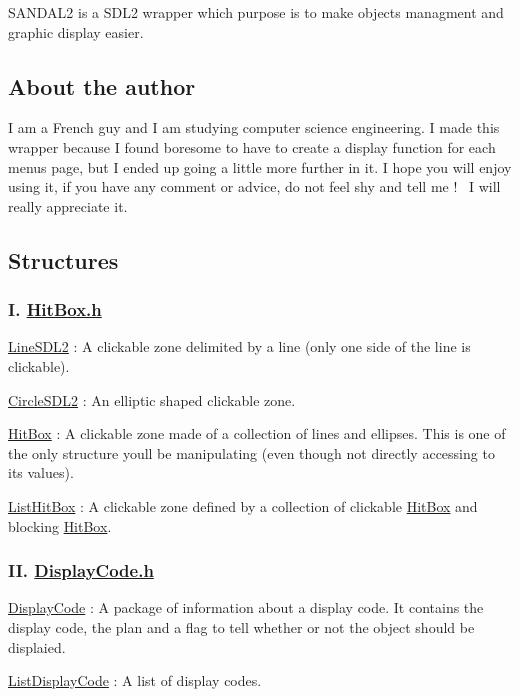 S\+A\+N\+D\+A\+L2 is a S\+D\+L2 wrapper which purpose is to make objects managment and graphic display easier.

\subsection*{About the author}

I am a French guy and I am studying computer science engineering. I made this wrapper because I found boresome to have to create a display function for each menu\textquotesingle{}s page, but I ended up going a little more further in it. I hope you will enjoy using it, if you have any comment or advice, do not feel shy and tell me !~\newline
 I will really appreciate it.

\subsection*{Structures}

\subsubsection*{I. \hyperlink{HitBox_8h}{Hit\+Box.\+h}}


\begin{DoxyEnumerate}
\item \hyperlink{structLineSDL2}{Line\+S\+D\+L2} \+: A clickable zone delimited by a line (only one side of the line is clickable).
\item \hyperlink{structCircleSDL2}{Circle\+S\+D\+L2} \+: An elliptic shaped clickable zone.
\item \hyperlink{structHitBox}{Hit\+Box} \+: A clickable zone made of a collection of lines and ellipses. This is one of the only structure you\textquotesingle{}ll be manipulating (even though not directly accessing to its values).
\item \hyperlink{structListHitBox}{List\+Hit\+Box} \+: A clickable zone defined by a collection of clickable \hyperlink{structHitBox}{Hit\+Box} and blocking \hyperlink{structHitBox}{Hit\+Box}.
\end{DoxyEnumerate}

\subsubsection*{II. \hyperlink{DisplayCode_8h}{Display\+Code.\+h}}


\begin{DoxyEnumerate}
\item \hyperlink{structDisplayCode}{Display\+Code} \+: A package of information about a display code. It contains the display code, the plan and a flag to tell whether or not the object should be displaied.
\item \hyperlink{structListDisplayCode}{List\+Display\+Code} \+: A list of display codes.
\end{DoxyEnumerate}

